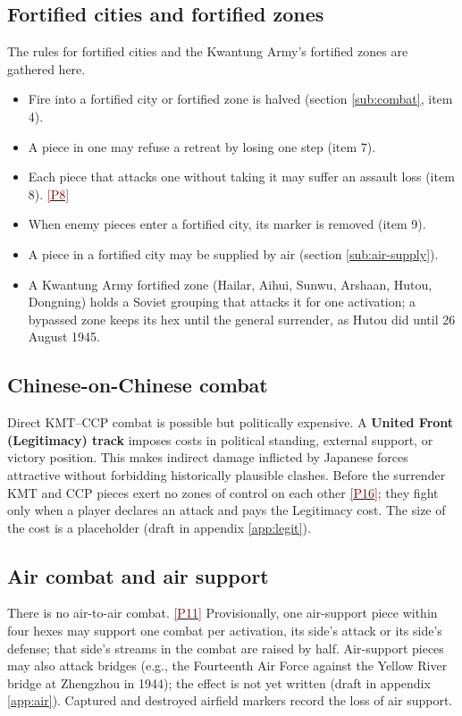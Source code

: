 \documentclass[11pt]{article}
\newcommand{\ptest}[1]{\hyperlink{ptest}{\textcolor{darkred}{[P#1]}}}
\begin{document}
\subsection{Fortified cities and fortified zones}\label{sub:fortified}
The rules for fortified cities and the Kwantung Army's fortified zones are gathered here.
\begin{itemize}
\item Fire into a fortified city or fortified zone is halved (section \ref{sub:combat}, item 4).
\item A piece in one may refuse a retreat by losing one step (item 7).
\item Each piece that attacks one without taking it may suffer an assault loss (item 8). \ptest{8}
\item When enemy pieces enter a fortified city, its marker is removed (item 9).
\item A piece in a fortified city may be supplied by air (section \ref{sub:air-supply}).
\item A Kwantung Army fortified zone (Hailar, Aihui, Sunwu, Arshaan, Hutou, Dongning) holds a Soviet grouping that attacks it for one activation; a bypassed zone keeps its hex until the general surrender, as Hutou did until 26 August 1945.
\end{itemize}

\subsection{Chinese-on-Chinese combat}\label{sub:civil}
Direct KMT--CCP combat is possible but politically expensive. A \textbf{United Front (Legitimacy) track} imposes costs in political standing, external support, or victory position. This makes indirect damage inflicted by Japanese forces attractive without forbidding historically plausible clashes. Before the surrender KMT and CCP pieces exert no zones of control on each other \ptest{16}; they fight only when a player declares an attack and pays the Legitimacy cost. The size of the cost is a placeholder (draft in appendix \ref{app:legit}).

\subsection{Air combat and air support}\label{sub:air-combat}
There is no air-to-air combat. \ptest{11} Provisionally, one air-support piece within four hexes may support one combat per activation, its side's attack or its side's defense; that side's streams in the combat are raised by half. Air-support pieces may also attack bridges (e.g., the Fourteenth Air Force against the Yellow River bridge at Zhengzhou in 1944); the effect is not yet written (draft in appendix \ref{app:air}). Captured and destroyed airfield markers record the loss of air support.
\end{document}

